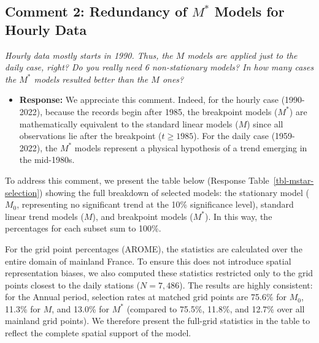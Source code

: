 \documentclass[
  letterpaper,
  DIV=11,
  numbers=noendperiod]{scrartcl}
\providecommand{\tightlist}{%
  \setlength{\itemsep}{0pt}\setlength{\parskip}{0pt}}\usepackage{longtable,booktabs,array}
\begin{document}
\clearpage

\subsection{\texorpdfstring{Comment 2: Redundancy of \(M^{*}\) Models
for Hourly
Data}{Comment 2: Redundancy of M\^{}\{*\} Models for Hourly Data}}\label{comment-2-redundancy-of-m-models-for-hourly-data}

\emph{Hourly data mostly starts in 1990. Thus, the \(M\) models are
applied just to the daily case, right? Do you really need 6
non-stationary models? In how many cases the \(M^*\) models resulted
better than the \(M\) ones?}

\begin{itemize}
\tightlist
\item
  \textbf{Response:} We appreciate this comment. Indeed, for the hourly
  case (1990-2022), because the records begin after 1985, the breakpoint
  models (\(M^{*}\)) are mathematically equivalent to the standard
  linear models (\(M\)) since all observations lie after the breakpoint
  (\(t\geq 1985\)). For the daily case (1959-2022), the \(M^{*}\) models
  represent a physical hypothesis of a trend emerging in the mid-1980s.
\end{itemize}

To address this comment, we present the table below (Response
Table~\ref{tbl-mstar-selection}) showing the full breakdown of selected
models: the stationary model (\(M_0\), representing no significant trend
at the 10\% significance level), standard linear trend models (\(M\)),
and breakpoint models (\(M^*\)). In this way, the percentages for each
subset sum to 100\%.

For the grid point percentages (AROME), the statistics are calculated
over the entire domain of mainland France. To ensure this does not
introduce spatial representation biases, we also computed these
statistics restricted only to the grid points closest to the daily
stations (\(N = 7,486\)). The results are highly consistent: for the
Annual period, selection rates at matched grid points are 75.6\% for
\(M_0\), 11.3\% for \(M\), and 13.0\% for \(M^*\) (compared to 75.5\%,
11.8\%, and 12.7\% over all mainland grid points). We therefore present
the full-grid statistics in the table to reflect the complete spatial
support of the model.
\end{document}
